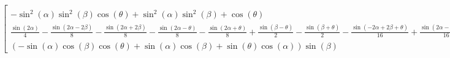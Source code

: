 \documentclass[preview]{standalone}
\begin{document}
$
    \displaystyle \left[\begin{matrix}- \sin^{2}{\left(\alpha \right)} \sin^{2}{\left(\beta \right)} \cos{\left(\theta \right)} + \sin^{2}{\left(\alpha \right)} \sin^{2}{\left(\beta \right)} + \cos{\left(\theta \right)} & \frac{\sin{\left(2 \alpha \right)}}{4} - \frac{\sin{\left(2 \alpha - 2 \beta \right)}}{8} - \frac{\sin{\left(2 \alpha + 2 \beta \right)}}{8} - \frac{\sin{\left(2 \alpha - \theta \right)}}{8} - \frac{\sin{\left(2 \alpha + \theta \right)}}{8} - \frac{\sin{\left(\beta - \theta \right)}}{2} + \frac{\sin{\left(\beta + \theta \right)}}{2} - \frac{\sin{\left(- 2 \alpha + 2 \beta + \theta \right)}}{16} + \frac{\sin{\left(2 \alpha - 2 \beta + \theta \right)}}{16} + \frac{\sin{\left(2 \alpha + 2 \beta - \theta \right)}}{16} + \frac{\sin{\left(2 \alpha + 2 \beta + \theta \right)}}{16} & \left(- \sin{\left(\alpha \right)} \cos{\left(\beta \right)} \cos{\left(\theta \right)} + \sin{\left(\alpha \right)} \cos{\left(\beta \right)} - \sin{\left(\theta \right)} \cos{\left(\alpha \right)}\right) \sin{\left(\beta \right)}\\\frac{\sin{\left(2 \alpha \right)}}{4} - \frac{\sin{\left(2 \alpha - 2 \beta \right)}}{8} - \frac{\sin{\left(2 \alpha + 2 \beta \right)}}{8} - \frac{\sin{\left(2 \alpha - \theta \right)}}{8} - \frac{\sin{\left(2 \alpha + \theta \right)}}{8} + \frac{\sin{\left(\beta - \theta \right)}}{2} - \frac{\sin{\left(\beta + \theta \right)}}{2} - \frac{\sin{\left(- 2 \alpha + 2 \beta + \theta \right)}}{16} + \frac{\sin{\left(2 \alpha - 2 \beta + \theta \right)}}{16} + \frac{\sin{\left(2 \alpha + 2 \beta - \theta \right)}}{16} + \frac{\sin{\left(2 \alpha + 2 \beta + \theta \right)}}{16} & \sin^{2}{\left(\alpha \right)} \sin^{2}{\left(\beta \right)} \cos{\left(\theta \right)} - \sin^{2}{\left(\alpha \right)} \sin^{2}{\left(\beta \right)} - \sin^{2}{\left(\beta \right)} \cos{\left(\theta \right)} + \sin^{2}{\left(\beta \right)} + \cos{\left(\theta \right)} & \left(\sin{\left(\alpha \right)} \sin{\left(\theta \right)} - \cos{\left(\alpha \right)} \cos{\left(\beta \right)} \cos{\left(\theta \right)} + \cos{\left(\alpha \right)} \cos{\left(\beta \right)}\right) \sin{\left(\beta \right)}\\\left(- \sin{\left(\alpha \right)} \cos{\left(\beta \right)} \cos{\left(\theta \right)} + \sin{\left(\alpha \right)} \cos{\left(\beta \right)} + \sin{\left(\theta \right)} \cos{\left(\alpha \right)}\right) \sin{\left(\beta \right)} & \left(- \sin{\left(\alpha \right)} \sin{\left(\theta \right)} - \cos{\left(\alpha \right)} \cos{\left(\beta \right)} \cos{\left(\theta \right)} + \cos{\left(\alpha \right)} \cos{\left(\beta \right)}\right) \sin{\left(\beta \right)} & \sin^{2}{\left(\beta \right)} \cos{\left(\theta \right)} - \sin^{2}{\left(\beta \right)} + 1\end{matrix}\right]
$
\end{document}
